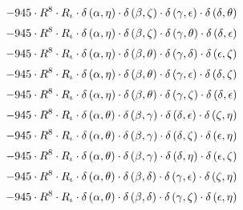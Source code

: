 \begin{subequations}
\begin{gather}
 \\[0.2em] \notag 		 - 945 \cdot R^{8} \cdot R_{\iota{}} \cdot \delta{}\left(\alpha{}, \eta{}\right) \cdot \delta{}\left(\beta{}, \zeta{}\right) \cdot \delta{}\left(\gamma{}, \epsilon{}\right) \cdot \delta{}\left(\delta{}, \theta{}\right) 
 \\[0.2em] \notag 		 - 945 \cdot R^{8} \cdot R_{\iota{}} \cdot \delta{}\left(\alpha{}, \eta{}\right) \cdot \delta{}\left(\beta{}, \zeta{}\right) \cdot \delta{}\left(\gamma{}, \theta{}\right) \cdot \delta{}\left(\delta{}, \epsilon{}\right) 
 \\[0.2em] \notag 		 - 945 \cdot R^{8} \cdot R_{\iota{}} \cdot \delta{}\left(\alpha{}, \eta{}\right) \cdot \delta{}\left(\beta{}, \theta{}\right) \cdot \delta{}\left(\gamma{}, \delta{}\right) \cdot \delta{}\left(\epsilon{}, \zeta{}\right) 
 \\[0.2em] \notag 		 - 945 \cdot R^{8} \cdot R_{\iota{}} \cdot \delta{}\left(\alpha{}, \eta{}\right) \cdot \delta{}\left(\beta{}, \theta{}\right) \cdot \delta{}\left(\gamma{}, \epsilon{}\right) \cdot \delta{}\left(\delta{}, \zeta{}\right) 
 \\[0.2em] \notag 		 - 945 \cdot R^{8} \cdot R_{\iota{}} \cdot \delta{}\left(\alpha{}, \eta{}\right) \cdot \delta{}\left(\beta{}, \theta{}\right) \cdot \delta{}\left(\gamma{}, \zeta{}\right) \cdot \delta{}\left(\delta{}, \epsilon{}\right) 
 \\[0.2em] \notag 		 - 945 \cdot R^{8} \cdot R_{\iota{}} \cdot \delta{}\left(\alpha{}, \theta{}\right) \cdot \delta{}\left(\beta{}, \gamma{}\right) \cdot \delta{}\left(\delta{}, \epsilon{}\right) \cdot \delta{}\left(\zeta{}, \eta{}\right) 
 \\[0.2em] \notag 		 - 945 \cdot R^{8} \cdot R_{\iota{}} \cdot \delta{}\left(\alpha{}, \theta{}\right) \cdot \delta{}\left(\beta{}, \gamma{}\right) \cdot \delta{}\left(\delta{}, \zeta{}\right) \cdot \delta{}\left(\epsilon{}, \eta{}\right) 
 \\[0.2em] \notag 		 - 945 \cdot R^{8} \cdot R_{\iota{}} \cdot \delta{}\left(\alpha{}, \theta{}\right) \cdot \delta{}\left(\beta{}, \gamma{}\right) \cdot \delta{}\left(\delta{}, \eta{}\right) \cdot \delta{}\left(\epsilon{}, \zeta{}\right) 
 \\[0.2em] \notag 		 - 945 \cdot R^{8} \cdot R_{\iota{}} \cdot \delta{}\left(\alpha{}, \theta{}\right) \cdot \delta{}\left(\beta{}, \delta{}\right) \cdot \delta{}\left(\gamma{}, \epsilon{}\right) \cdot \delta{}\left(\zeta{}, \eta{}\right) 
 \\[0.2em] \notag 		 - 945 \cdot R^{8} \cdot R_{\iota{}} \cdot \delta{}\left(\alpha{}, \theta{}\right) \cdot \delta{}\left(\beta{}, \delta{}\right) \cdot \delta{}\left(\gamma{}, \zeta{}\right) \cdot \delta{}\left(\epsilon{}, \eta{}\right) 

\end{gather}
\end{subequations}
